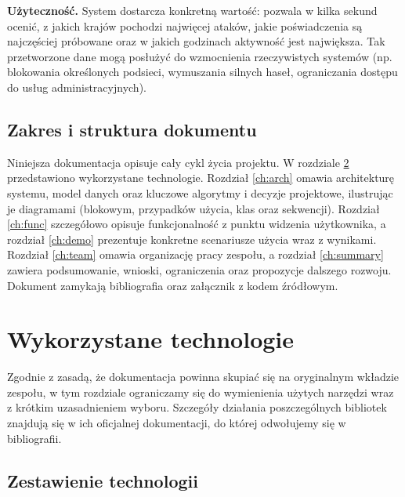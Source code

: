\documentclass[12pt,a4paper]{report}
\begin{document}
\textbf{Użyteczność.} System dostarcza konkretną wartość: pozwala w kilka sekund
ocenić, z jakich krajów pochodzi najwięcej ataków, jakie poświadczenia są
najczęściej próbowane oraz w jakich godzinach aktywność jest największa. Tak
przetworzone dane mogą posłużyć do wzmocnienia rzeczywistych systemów (np.
blokowania określonych podsieci, wymuszania silnych haseł, ograniczania dostępu
do usług administracyjnych).

\section{Zakres i struktura dokumentu}

Niniejsza dokumentacja opisuje cały cykl życia projektu. W rozdziale
\ref{ch:tech} przedstawiono wykorzystane technologie. Rozdział \ref{ch:arch}
omawia architekturę systemu, model danych oraz kluczowe algorytmy i decyzje
projektowe, ilustrując je diagramami (blokowym, przypadków użycia, klas oraz
sekwencji). Rozdział \ref{ch:func} szczegółowo opisuje funkcjonalność z punktu
widzenia użytkownika, a rozdział \ref{ch:demo} prezentuje konkretne scenariusze
użycia wraz z wynikami. Rozdział \ref{ch:team} omawia organizację pracy zespołu,
a rozdział \ref{ch:summary} zawiera podsumowanie, wnioski, ograniczenia oraz
propozycje dalszego rozwoju. Dokument zamykają bibliografia oraz załącznik
z kodem źródłowym.

\chapter{Wykorzystane technologie}
\label{ch:tech}

Zgodnie z zasadą, że dokumentacja powinna skupiać się na oryginalnym wkładzie
zespołu, w tym rozdziale ograniczamy się do wymienienia użytych narzędzi wraz
z krótkim uzasadnieniem wyboru. Szczegóły działania poszczególnych bibliotek
znajdują się w ich oficjalnej dokumentacji, do której odwołujemy się
w bibliografii.

\section{Zestawienie technologii}
\end{document}
